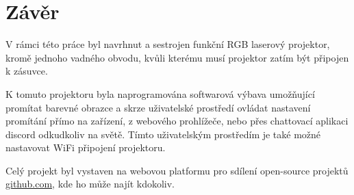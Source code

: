 \newpage
\chapter*{Závěr}

V rámci této práce byl navrhnut a sestrojen funkční RGB laserový projektor, kromě jednoho vadného obvodu, kvůli kterému musí projektor zatím být připojen k zásuvce.

K tomuto projektoru byla naprogramována softwarová výbava umožňující promítat barevné obrazce a skrze uživatelské prostředí ovládat nastavení promítání přímo na zařízení, z webového prohlížeče, nebo přes chattovací aplikaci discord odkudkoliv na světě. Tímto uživatelským prostředím je také možné nastavovat WiFi připojení projektoru.

Celý projekt byl vystaven na webovou platformu pro sdílení open-source projektů \url{github.com}, kde ho může najít kdokoliv.


